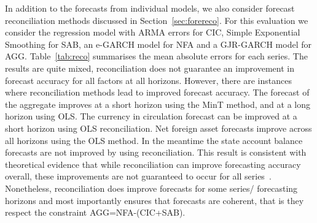 In addition to the forecasts from individual models, we also consider forecast reconciliation methods discussed in Section~\ref{sec:forereco}. For this evaluation we consider the regression model with ARMA errors for CIC, Simple Exponential Smoothing for SAB, an e-GARCH model for NFA and a GJR-GARCH model for AGG. Table~\ref{tab:reco} summarises the mean absolute errors for each series. The results are quite mixed, reconciliation does not guarantee an improvement in forecast accuracy for all factors at all horizons. However, there are instances where reconciliation methods lead to improved forecast accuracy. The forecast of the aggregate improves at a short horizon using the MinT method, and at a long horizon using OLS. The currency in circulation forecast can be improved at a short horizon using OLS reconciliation. Net foreign asset forecasts improve across all horizons using the OLS method. In the meantime the state account balance forecasts are not improved by using reconciliation. This result is consistent with theoretical evidence that while reconciliation can improve forecasting accuracy overall, these improvements are not guaranteed to occur for all series~\citep{PanEtAl2021}. Nonetheless, reconciliation does improve forecasts for some series/ forecasting horizons and most importantly ensures that forecasts are coherent, that is they respect the constraint AGG=NFA-(CIC+SAB).

